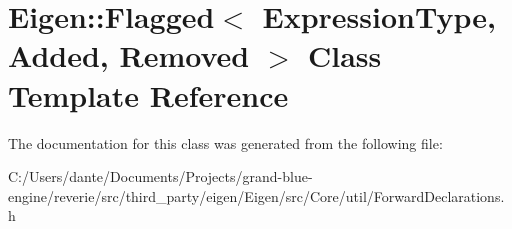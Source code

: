 \hypertarget{class_eigen_1_1_flagged}{}\section{Eigen\+::Flagged$<$ Expression\+Type, Added, Removed $>$ Class Template Reference}
\label{class_eigen_1_1_flagged}


The documentation for this class was generated from the following file\+:\begin{DoxyCompactItemize}
\item 
C\+:/\+Users/dante/\+Documents/\+Projects/grand-\/blue-\/engine/reverie/src/third\+\_\+party/eigen/\+Eigen/src/\+Core/util/Forward\+Declarations.\+h\end{DoxyCompactItemize}
